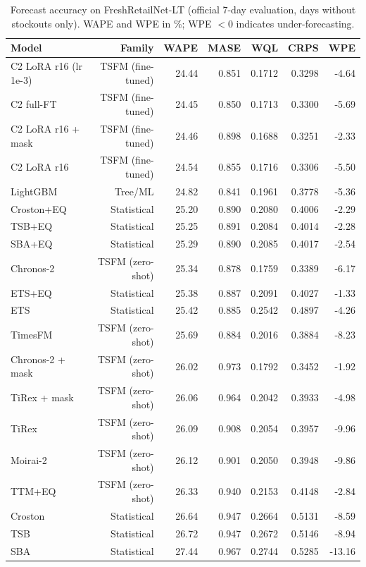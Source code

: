 \begin{table}[t]
\centering
\small
\caption{Forecast accuracy on FreshRetailNet-LT (official 7-day evaluation, days without stockouts only). WAPE and WPE in \%; WPE $<0$ indicates under-forecasting.}
\label{tab:table4_accuracy_lt}
\begin{tabular}{lrrrrrr}
\toprule
Model & Family & WAPE & MASE & WQL & CRPS & WPE \\
\midrule
C2 LoRA r16 (lr 1e-3) & TSFM (fine-tuned) & 24.44 & 0.851 & 0.1712 & 0.3298 & -4.64 \\
C2 full-FT & TSFM (fine-tuned) & 24.45 & 0.850 & 0.1713 & 0.3300 & -5.69 \\
C2 LoRA r16 + mask & TSFM (fine-tuned) & 24.46 & 0.898 & 0.1688 & 0.3251 & -2.33 \\
C2 LoRA r16 & TSFM (fine-tuned) & 24.54 & 0.855 & 0.1716 & 0.3306 & -5.50 \\
LightGBM & Tree/ML & 24.82 & 0.841 & 0.1961 & 0.3778 & -5.36 \\
Croston+EQ & Statistical & 25.20 & 0.890 & 0.2080 & 0.4006 & -2.29 \\
TSB+EQ & Statistical & 25.25 & 0.891 & 0.2084 & 0.4014 & -2.28 \\
SBA+EQ & Statistical & 25.29 & 0.890 & 0.2085 & 0.4017 & -2.54 \\
Chronos-2 & TSFM (zero-shot) & 25.34 & 0.878 & 0.1759 & 0.3389 & -6.17 \\
ETS+EQ & Statistical & 25.38 & 0.887 & 0.2091 & 0.4027 & -1.33 \\
ETS & Statistical & 25.42 & 0.885 & 0.2542 & 0.4897 & -4.26 \\
TimesFM & TSFM (zero-shot) & 25.69 & 0.884 & 0.2016 & 0.3884 & -8.23 \\
Chronos-2 + mask & TSFM (zero-shot) & 26.02 & 0.973 & 0.1792 & 0.3452 & -1.92 \\
TiRex + mask & TSFM (zero-shot) & 26.06 & 0.964 & 0.2042 & 0.3933 & -4.98 \\
TiRex & TSFM (zero-shot) & 26.09 & 0.908 & 0.2054 & 0.3957 & -9.96 \\
Moirai-2 & TSFM (zero-shot) & 26.12 & 0.901 & 0.2050 & 0.3948 & -9.86 \\
TTM+EQ & TSFM (zero-shot) & 26.33 & 0.940 & 0.2153 & 0.4148 & -2.84 \\
Croston & Statistical & 26.64 & 0.947 & 0.2664 & 0.5131 & -8.59 \\
TSB & Statistical & 26.72 & 0.947 & 0.2672 & 0.5146 & -8.94 \\
SBA & Statistical & 27.44 & 0.967 & 0.2744 & 0.5285 & -13.16 \\

\end{tabular}
\end{table}
